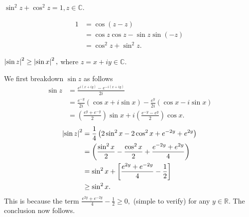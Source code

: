 \documentclass[12pt]{book}
\begin{document}
\begin{exmp}
    $\sin^{2}z + \cos^{2}z = 1, z \in \mathbb{C}.$
\end{exmp}
\begin{align*}
    1
        &=
            \cos(z - z) \\
        &=
            \cos z \cos z - \sin z \sin (-z) \\
        &=
            \cos^{2}z + \sin^{2}z.
\end{align*}

\begin{exmp}
    $\left\lvert \sin z \right\rvert^{2} \geq \left\lvert \sin x \right\rvert^{2},$ where $z = x + iy \in \mathbb{C}.$
\end{exmp}
We first breakdown $\sin z$ as follows
\begin{align*}
    \sin z
        &=
            \frac{e^{i(x + iy)} - e^{-i(x + iy)}}{2i} \\
        &=
            \frac{e^{-y}}{2i}(\cos x + i \sin x) - \frac{e^{y}}{2i}(\cos x - i \sin x) \\
        &=
            \left(\frac{e^{y} + e^{-y}}{2}\right)\sin x + i \left(\frac{e^{-y} - e^{y}}{2}\right)\cos x.
\end{align*}
\begin{align*}
    \left\lvert \sin z \right\rvert^{2}
        &=
            \frac{1}{4}\left(2 \sin^{2}x - 2\cos^{2}x + e^{-2y} + e^{2y}\right) \\
        &=
            \left(\frac{\sin^{2}x}{2} - \frac{\cos^{2}x}{2} + \frac{e^{-2y} + e^{2y}}{4}\right) \\
        &=
            \sin^{2}x + \left[\frac{e^{2y} + e^{-2y}}{4} - \frac{1}{2}\right] \\
        &\geq
            \sin^{2}x.
\end{align*}
This is because the term $\frac{e^{2y} + e^{-2y}}{4} - \frac{1}{2} \geq 0,$ (simple to verify) for any $y \in \mathbb{R}.$ The conclusion now follows.
\end{document}
